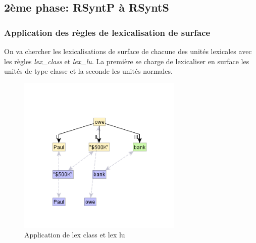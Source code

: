 
\subsection{2ème phase: RSyntP à RSyntS}

\subsubsection{Application des règles de lexicalisation de surface}
On va chercher les lexicalisations de surface de chacune des unités lexicales avec les règles \emph{lex\_class} et \emph{lex\_lu}. La première se charge de lexicaliser en surface les unités de type classe et la seconde les unités normales. \FL{\ldots}

\begin{figure}[htb]
	\centering
	\includegraphics[width=0.7\textwidth, trim = {0cm 0cm 0cm 0cm},clip]{ch3/figs/rsyntslexicalisation1.png}
	\caption{Application de lex class et lex lu}
	\label{fig:lexsurf}
\end{figure}

